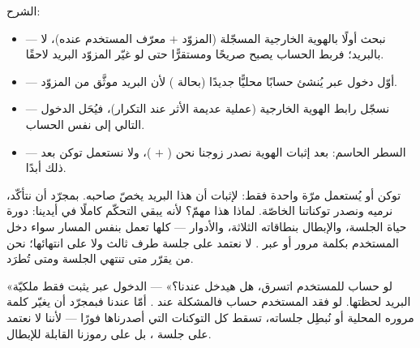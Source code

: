 الشرح:
\begin{itemize}
\item {} — نبحث أولًا بالهوية الخارجية المسجّلة
  (المزوّد $+$ معرّف المستخدم عنده)، لا بالبريد؛ فربط الحساب يصبح صريحًا ومستقرًّا
  حتى لو غيّر المزوّد البريد لاحقًا.
\item {} — أوّل دخول عبر  يُنشئ حسابًا محليًّا جديدًا
  (بحالة ) لأن البريد موثَّق من المزوّد.
\item {} — نسجّل رابط الهوية الخارجية (عملية عديمة الأثر
  عند التكرار)، فيُحَل الدخول التالي إلى نفس الحساب.
\item {} — السطر الحاسم: بعد إثبات الهوية نصدر
  زوجنا نحن ( $+$ )، ولا نستعمل توكن  بعد ذلك أبدًا.
\end{itemize}

\begin{spotlight}
توكن  أو  يُستعمل مرّة واحدة فقط: لإثبات أن هذا البريد
يخصّ صاحبه. بمجرّد أن نتأكّد، نرميه ونصدر توكناتنا الخاصّة. لماذا هذا مهمّ؟ لأنه
يبقي التحكّم كاملًا في أيدينا: دورة حياة الجلسة، والإبطال بنطاقاته الثلاثة،
والأدوار — كلها تعمل بنفس المسار سواء دخل المستخدم بكلمة مرور أو عبر .
لا نعتمد على جلسة طرف ثالث ولا على انتهائها؛ نحن من يقرّر متى تنتهي الجلسة ومتى
تُطرَد.
\end{spotlight}

\begin{qa}
«لو حساب  للمستخدم اتسرق، هل هيدخل عندنا؟» — الدخول عبر  يثبت
فقط ملكيّة البريد لحظتها. لو فقد المستخدم حساب  فالمشكلة عند .
أمّا عندنا فبمجرّد أن يغيّر كلمة مروره المحلية أو نُبطِل جلساته، تسقط كل التوكنات
التي أصدرناها فورًا — لأننا لا نعتمد على جلسة ، بل على رموزنا القابلة
للإبطال.
\end{qa}

